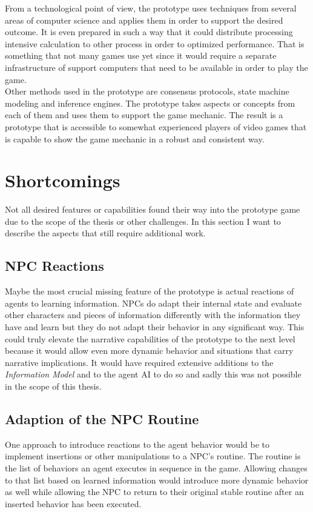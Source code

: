 From a technological point of view, the prototype uses techniques from several areas of computer science and applies them in order to support the desired outcome. It is even prepared in such a way that it could distribute processing intensive calculation to other process in order to optimized performance. That is something that not many games use yet since it would require a separate infrastructure of support computers that need to be available in order to play the game.\\
Other methods used in the prototype are consensus protocols, state machine modeling and inference engines. The prototype takes aspects or concepts from each of them and uses them to support the game mechanic. The result is a prototype that is accessible to somewhat experienced players of video games that is capable to show the game mechanic in a robust and consistent way.
\section{Shortcomings}
Not all desired features or capabilities found their way into the prototype game due to the scope of the thesis or other challenges. In this section I want to describe the aspects that still require additional work.
\subsection{NPC Reactions}
Maybe the most crucial missing feature of the prototype is actual reactions of agents to learning information. NPCs do adapt their internal state and evaluate other characters and pieces of information differently with the information they have and learn but they do not adapt their behavior in any significant way. This could truly elevate the narrative capabilities of the prototype to the next level because it would allow even more dynamic behavior and situations that carry narrative implications. It would have required extensive additions to the \textit{Information Model} and to the agent AI to do so and sadly this was not possible in the scope of this thesis.
\subsection{Adaption of the NPC Routine}
One approach to introduce reactions to the agent behavior would be to implement insertions or other manipulations to a NPC's routine. The routine is the list of behaviors an agent executes in sequence in the game. Allowing changes to that list based on learned information would introduce more dynamic behavior as well while allowing the NPC to return to their original stable routine after an inserted behavior has been executed.
